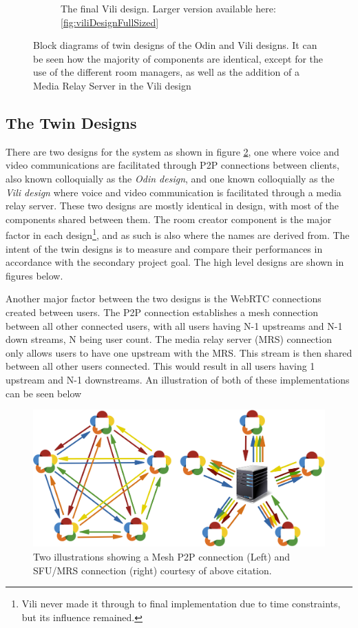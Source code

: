 \begin{figure}[H]
\begin{subfigure}[b]{0.48\textwidth}
        \caption{The final Vili design. Larger version available here: \ref{fig:viliDesignFullSized}}
        \label{fig:vilifinaldesign}
    \end{subfigure}
    \caption{Block diagrams of twin designs of the Odin and Vili designs. It can be seen how the majority of components are identical, except for the use of the different room managers, as well as the addition of a Media Relay Server in the Vili design}
    \label{fig:finaldesigns}
\end{figure}

\subsection{The Twin Designs}

There are two designs for the system as shown in figure \ref{fig:finaldesigns}, one where voice and video communications are facilitated through P2P connections between clients, also known colloquially as the \textit{Odin design}, and one known colloquially as the \textit{Vili design} where voice and video communication is facilitated through a media relay server. These two designs are mostly identical in design, with most of the components shared between them. The room creator component is the major factor in each design\footnote{Vili never made it through to final implementation due to time constraints, but its influence remained.}, and as such is also where the names are derived from. The intent of the twin designs is to measure and compare their performances in accordance with the secondary project goal. The high level designs are shown in figures below.

Another major factor between the two designs is the WebRTC connections created between users. The P2P connection establishes a mesh connection between all other connected users, with all users having N-1 upstreams and N-1 down streams, N being user count. The media relay server (MRS) connection only allows users to have one upstream with the MRS. This stream is then shared between all other users connected. This would result in all users having 1 upstream and N-1 downstreams. An illustration of both of these implementations can be seen below \cite{webrtc-server}

\begin{figure}[ht]
    \centering
    \includegraphics[width=\textwidth]{Pictures/webrtc-SFU-mesh.png}
    \caption{Two illustrations showing a Mesh P2P connection (Left) and SFU/MRS connection (right) courtesy of above citation.}
    \label{fig:gantt}
\end{figure}

